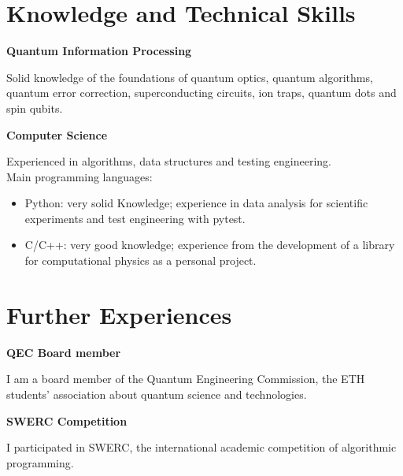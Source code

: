 \documentclass[a4paper,10pt]{article}
\begin{document}
\begin{adjustbox}{valign=t}
\begin{minipage}{0.6\textwidth}
\section*{Knowledge and Technical Skills}
\begin{description}
\setlength\itemsep{-2em}

\item \textbf{Quantum Information Processing}
\begin{spacing}{1.1}
	\small Solid knowledge of the foundations of quantum optics, quantum algorithms, quantum error correction, superconducting circuits, ion traps, quantum dots and spin qubits.
\end{spacing}
\item \textbf{Computer Science}
\begin{spacing}{1.1}
	\small
	Experienced in algorithms, data structures and testing engineering.\\
	Main programming languages: 
	\begin{itemize}
		\item Python: very solid Knowledge; experience in data analysis for scientific experiments and test engineering with pytest.
		\item C/C++: very good knowledge; experience from the development of a library for computational physics as a personal project.
	\end{itemize}
\end{spacing}
\end{description}
\vspace{-1cm}
\section*{Further Experiences}
\begin{description}

\raggedright
\item[\normalfont \textcolor{ColorTwo}{Spring 2022 - Now}] 
	\textbf{QEC Board member}\\
	\begin{spacing}{1.1}
		\small
	I am a board member of the Quantum Engineering Commission, the ETH students' association about quantum science and technologies.
	\end{spacing}

\raggedright
\item[\normalfont \textcolor{ColorTwo}{March 2021}] 
	\textbf{SWERC Competition}\\
	\begin{spacing}{1.1}
		\small
		I participated in SWERC, the international academic competition of algorithmic programming.
	\end{spacing}


\end{description}
\end{minipage}
\end{adjustbox}
\end{document}
